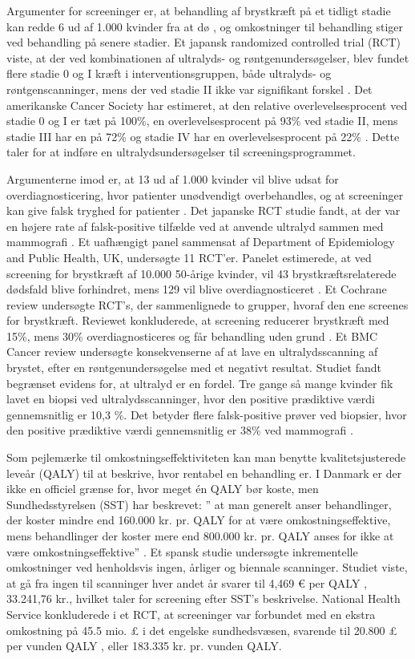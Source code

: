Argumenter for screeninger er, at behandling af brystkræft på et tidligt stadie kan redde 6 ud af 1.000 kvinder fra at dø \cite{Argumenter}, og omkostninger til behandling stiger ved behandling på senere stadier\cite{StadieOmkostninger}. Et japansk randomized controlled trial (RCT) viste, at der ved kombinationen af ultralyds- og røntgenundersøgelser, blev fundet flere stadie 0 og I kræft i interventionsgruppen, både ultralyds- og røntgenscanninger, mens der ved stadie II ikke var signifikant forskel \cite{Japan}. Det amerikanske Cancer Society har estimeret, at den relative overlevelsesprocent ved stadie 0 og I er tæt på 100\%, en overlevelsesprocent på 93\% ved stadie II, mens stadie III har en på 72\% og stadie IV har en overlevelsesprocent på 22\% \cite{CancerSociety}. Dette taler for at indføre en ultralydsundersøgelser til screeningsprogrammet. 

Argumenterne imod er, at 13 ud af 1.000 kvinder vil blive udsat for overdiagnosticering, hvor patienter unødvendigt overbehandles, og at screeninger kan give falsk tryghed for patienter \cite{Argumenter}. Det japanske RCT studie fandt, at der var en højere rate af falsk-positive tilfælde ved at anvende ultralyd sammen med mammografi \cite{Japan}. Et uafhængigt panel sammensat af Department of Epidemiology and Public Health, UK, undersøgte 11 RCT’er. Panelet estimerede, at ved screening for brystkræft af 10.000 50-årige kvinder, vil 43 brystkræftsrelaterede dødsfald blive forhindret, mens 129 vil blive overdiagnosticeret \cite{Panel}. Et Cochrane review undersøgte RCT’s, der sammenlignede to grupper, hvoraf den ene screenes for brystkræft. Reviewet konkluderede, at screening reducerer brystkræft med 15\%, mens 30\% overdiagnosticeres og får behandling uden grund \cite{Gotzche}. Et BMC Cancer review undersøgte konsekvenserne af at lave en ultralydsscanning af brystet, efter en røntgenundersøgelse med et negativt resultat. Studiet fandt begrænset evidens for, at ultralyd er en fordel. Tre gange så mange kvinder fik lavet en biopsi ved ultralydsscanninger, hvor den positive prædiktive værdi gennemsnitlig er 10,3 \%. Det betyder flere falsk-positive prøver ved biopsier, hvor den positive prædiktive værdi gennemsnitlig er 38\% ved mammografi \cite{DenseBreast}. 

Som pejlemærke til omkostningseffektiviteten kan man benytte kvalitetsjusterede leveår (QALY) til at beskrive, hvor rentabel en behandling er. I Danmark er der ikke en officiel grænse for, hvor meget én QALY bør koste, men Sundhedsstyrelsen (SST) har beskrevet: ” at man generelt anser behandlinger, der koster mindre end 160.000 kr. pr. QALY for at være omkostningseffektive, mens behandlinger der koster mere end 800.000 kr. pr. QALY anses for ikke at være omkostningseffektive” \cite{QALY}. Et spansk studie undersøgte inkrementelle omkostninger ved henholdsvis ingen, årliger og biennale scanninger. Studiet viste, at gå fra ingen til scanninger hver andet år svarer til 4,469 € per QALY \cite{SpanskStudie}, 33.241,76 kr., hvilket taler for screening efter SST's beskrivelse. National Health Service konkluderede i et RCT, at screeninger var forbundet med en ekstra omkostning på 45.5 mio. £ i det engelske sundhedsvæsen, svarende til 20.800 £ per vunden QALY \cite{NHS}, eller 183.335 kr. pr. vunden QALY.  

